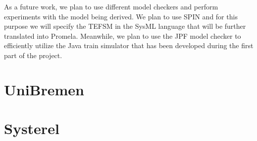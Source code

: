 \documentclass{template/openetcs_article}
\begin{document}
As a future work, we plan to use different model checkers and perform experiments with the model being derived. We plan to use SPIN and for this purpose we will specify the TEFSM in the SysML language that will be further translated into Promela. Meanwhile, we plan to use the JPF model checker to efficiently utilize the Java train simulator that has been developed during the first part of the project.

\newpage



\newpage

\section{UniBremen}



\newpage

\section{Systerel}







\nocite{*}

%



%
\end{document}
